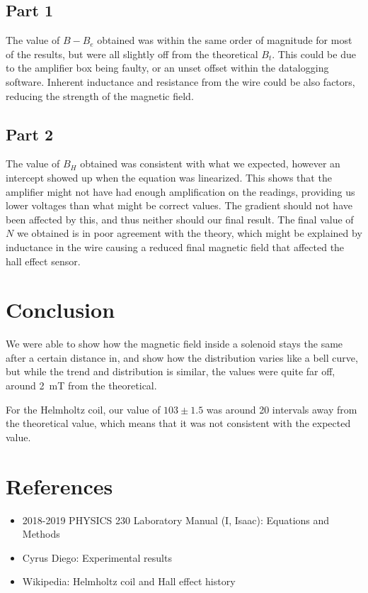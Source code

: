 \documentclass[12pt]{article}
\begin{document}
\subsection*{Part 1}
The value of $B-B_e$ obtained was within the same order of magnitude for most of
the results, but were all slightly off from the theoretical $B_t$. This could be
due to the amplifier box being faulty, or an unset offset within the datalogging
software. Inherent inductance and resistance from the wire could be also factors,
reducing the strength of the magnetic field.
\subsection*{Part 2}
The value of $B_H$ obtained was consistent with what we expected, however an
intercept showed up when the equation was linearized. This shows that the
amplifier might not have had enough amplification on the readings, providing us
lower voltages than what might be correct values. The gradient should not have
been affected by this, and thus neither should our final result. The final value
of $N$ we obtained is in poor agreement with the theory, which might be explained
by inductance in the wire causing a reduced final magnetic field that affected the
hall effect sensor.
\section{Conclusion}
We were able to show how the magnetic field inside a solenoid stays the same
after a certain distance in, and show how the distribution varies like a bell
curve, but while the trend and distribution is similar, the values were quite
far off, around \SI{2}{\milli\tesla} from the theoretical.

For the Helmholtz coil, our value of $103\pm1.5$ was around 20 intervals away
from the theoretical value, which means that it was not consistent with the expected value.
\pagebreak
\section*{References}
\begin{itemize}
    \item 2018-2019 PHYSICS 230 Laboratory Manual (I, Isaac): Equations and Methods
    \item Cyrus Diego: Experimental results
    \item Wikipedia: Helmholtz coil and Hall effect history
\end{itemize}
\pagebreak
\end{document}
